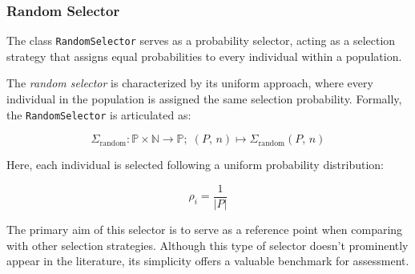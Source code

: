 \subsubsection{Random Selector}
\label{sec:keen:operators:selection:random}
  The class \texttt{RandomSelector} serves as a probability selector, acting 
  as a selection strategy that assigns equal probabilities to every 
  individual within a population.
  
  \begin{definition}
  \label{def:keen:operators:selection:random}
    The \emph{random selector} is characterized by its uniform approach, where every individual in the population is assigned the same selection probability.
    Formally, the \texttt{RandomSelector} is articulated as:
    
    \begin{equation}
      \Sigma_{\mathrm{random}} : 
        \mathbb{P} \times \mathbb{N} \to \mathbb{P};\; 
      (P,\, n) \mapsto \Sigma_{\mathrm{random}}(P,\, n)  
    \end{equation}
    
    Here, each individual is selected following a uniform probability 
    distribution:
    
    \begin{equation}
      \rho_i = \frac{1}{|P|}
    \end{equation}
  \end{definition}
  
  The primary aim of this selector is to serve as a reference point when 
  comparing with other selection strategies.
  Although this type of selector doesn't prominently appear in the 
  literature, its simplicity offers a valuable benchmark for assessment.
  
